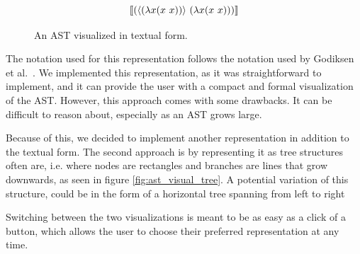 \begin{figure}[H]
    \Large
    \begin{equation*}
      \llbracket (\langle (\lambda{x}{(x~x)}) \rangle~(\lambda{x}{(x~x)})) \rrbracket
    \end{equation*}
    \caption{An AST visualized in textual form.}
    \label{fig:ast-in-text-form}
\end{figure}

The notation used for this representation follows the notation used by Godiksen
et al.~\pepm. We implemented this representation, as it was straightforward to
implement, and it can provide the user with a compact and formal visualization
of the AST. However, this approach comes with some drawbacks. It can be
difficult to reason about, especially as an AST grows large.

Because of this, we decided to implement another representation in addition to
the textual form. The second approach is by representing it as tree structures
often are, i.e. where nodes are rectangles and branches are lines that grow
downwards, as seen in figure \ref{fig:ast_visual_tree}. A potential variation
of this structure, could be in the form of a horizontal tree spanning from left
to right

Switching between the two visualizations is meant to be as easy as a click of a
button, which allows the user to choose their preferred representation at any
time.


